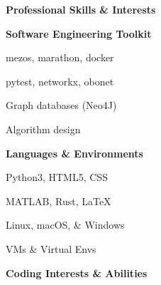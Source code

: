 \documentclass[letterpaper,final]{memoir}
\newcommand{\Sep}{\vspace{1.0em}}
\newcommand{\SmallSep}{\vspace{0.4em}}
\newcommand{\CVSection}[1]
	{\LARGE\textbf{#1}\par
	\SmallSep\normalsize}
\newcommand{\CVItem}[1]
	{\textbf{\color{Blue} #1}}
\begin{document}

\notoserif \CVSection{Professional Skills \& Interests}
\normalfont

\Sep
\CVItem{Software Engineering Toolkit}
\SmallSep

\begin{multicols}{4}

    \begin{compactitem}[\color{Blue}$\circ$]
		
		\item mezos, marathon, docker
        \SmallSep
        
        \item pytest, networkx, obonet
        \SmallSep
        
        \item Graph databases (Neo4J)
        \SmallSep
        
        \item Algorithm design
        
    
	\end{compactitem}

\end{multicols}


\CVItem{Languages \& Environments}
\SmallSep

\begin{multicols}{4}

    \begin{compactitem}[\color{Blue}$\circ$]
		
		\item Python3, HTML5, CSS
        \SmallSep
        
        \item MATLAB, Rust, LaTeX
		\SmallSep
        
        \item Linux, macOS, \& Windows
        \SmallSep

        \item VMs \& Virtual Envs
    
	\end{compactitem}

\end{multicols}


\CVItem{Coding Interests \& Abilities}
\SmallSep
\end{document}
